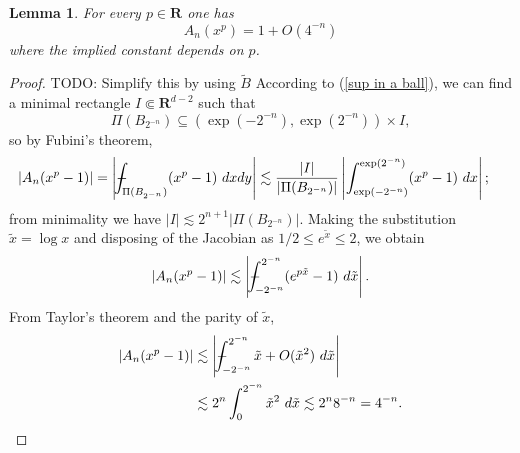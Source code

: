 \documentclass[reqno,12pt,letterpaper]{amsart}
\newcommand{\RR}{\mathbf{R}}
\newtheorem{lemma}[theorem]{Lemma}
\theoremstyle{definition}
\numberwithin{equation}{section}
\def\Xint#1{\mathchoice
{\XXint\displaystyle\textstyle{#1}}%
{\XXint\textstyle\scriptstyle{#1}}%
{\XXint\scriptstyle\scriptscriptstyle{#1}}%
{\XXint\scriptscriptstyle\scriptscriptstyle{#1}}%
\!\int}
\def\XXint#1#2#3{{\setbox0=\hbox{$#1{#2#3}{\int}$ }
\vcenter{\hbox{$#2#3$ }}\kern-.6\wd0}}
\def\dashint{\Xint-}
\begin{document}
\begin{lemma}\label{average of xp is harmless}
For every $p \in \RR$ one has
$$A_n(x^p) = 1 + O(4^{-n})$$
where the implied constant depends on $p$.
\end{lemma}
\begin{proof}
TODO: Simplify this by using $\tilde B$
According to (\ref{sup in a ball}), we can find a minimal rectangle $I \Subset \RR^{d - 2}$ such that
$$\Pi(B_{2^{-n}}) \subseteq (\exp(-2^{-n}), \exp(2^{-n})) \times I,$$
so by Fubini's theorem,
\begin{align*}|A_n(x^p - 1)| &= \left|\dashint_{\Pi(B_{2^{-n}})} (x^p - 1) ~dxdy\right| \lesssim \frac{|I|}{|\Pi(B_{2^{-n}})|} \left|\int_{\exp(-2^{-n})}^{\exp(2^{-n})} (x^p - 1)~ dx\right|;
\end{align*}
from minimality we have $|I| \lesssim 2^{n + 1} |\Pi(B_{2^{-n}})|$.
Making the substitution $\tilde x = \log x$ and disposing of the Jacobian as $1/2 \leq e^{\tilde x} \leq 2$, we obtain
$$|A_n(x^p - 1)| \lesssim \left|\dashint_{-2^{-n}}^{2^{-n}} (e^{p\tilde x} - 1) ~d\tilde x\right|.$$
From Taylor's theorem and the parity of $\tilde x$,
\begin{align*}
|A_n(x^p - 1)| &\lesssim \left|\dashint_{-2^{-n}}^{2^{-n}} \tilde x + O(\tilde x^2) ~d\tilde x\right| \\
&\lesssim 2^n \int_0^{2^{-n}} \tilde x^2 ~d\tilde x \lesssim 2^n 8^{-n} = 4^{-n}. \qedhere
\end{align*}
\end{proof}
\end{document}
